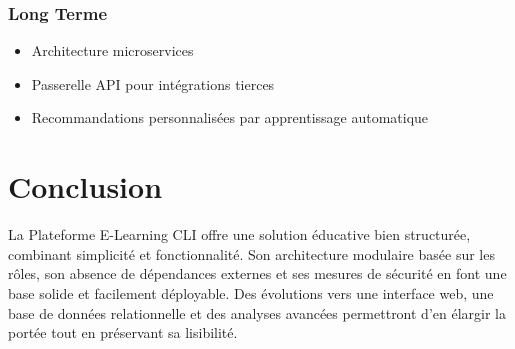 \documentclass[12pt,a4paper]{article}
\begin{document}
\subsubsection{Long Terme}
\begin{itemize}
    \item Architecture microservices
    \item Passerelle API pour intégrations tierces
    \item Recommandations personnalisées par apprentissage automatique
\end{itemize}

\section{Conclusion}

La Plateforme E-Learning CLI offre une solution éducative bien structurée, combinant simplicité et fonctionnalité. Son architecture modulaire basée sur les rôles, son absence de dépendances externes et ses mesures de sécurité en font une base solide et facilement déployable. Des évolutions vers une interface web, une base de données relationnelle et des analyses avancées permettront d'en élargir la portée tout en préservant sa lisibilité.
\end{document}
